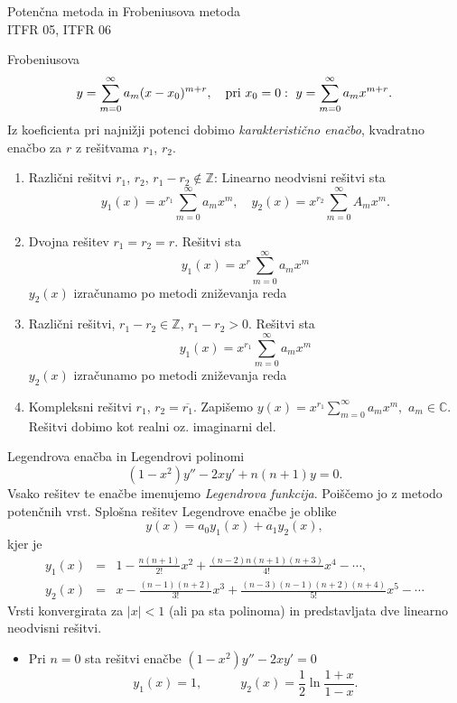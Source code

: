 \documentclass[a4paper,10pt]{article}
\begin{document}
\begin{multicols}{2}
\begin{formulaBox}{Potenčna metoda in Frobeniusova metoda}
	\\
	ITFR 05, ITFR 06

	Frobeniusova
	$$y=\sum_{m=0}^\infty a_m (x-x_0)^{m+r},\text{\quad pri }x_0=0:\  y=\sum_{m=0}^\infty a_m x^{m+r}.$$
	Iz koeficienta pri najnižji potenci  dobimo \emph{karakteristično enačbo}, kvadratno enačbo za $r$ %
	z rešitvama $r_1$, $r_2$.
	\begin{enumerate}
		\item Različni rešitvi $r_1$, $r_2$, $r_1-r_2\notin \mathbb{Z}$: Linearno neodvisni rešitvi sta 
   	$$			y_1(x)=x^{r_1}\sum_{m=0}^\infty a_m x^m,\quad
			y_2(x)=x^{r_2}\sum_{m=0}^\infty A_m x^m.$$
		
		\item Dvojna rešitev $r_1=r_2=r$.
		Rešitvi  sta
		$$y_1(x)= x^{r}\sum_{m=0}^\infty a_m x^m$$
		$y_2(x)$ izračunamo po metodi zniževanja reda
		
		\item Različni rešitvi, $r_1-r_2\in \mathbb{Z}$, $r_1-r_2> 0$. Rešitvi sta 
		$$			y_1(x)=x^{r_1} \sum_{m=0}^\infty a_m x^m$$
		$y_2(x)$ izračunamo po metodi zniževanja reda

		\item Kompleksni  rešitvi $r_1$, $r_2=\overline{r_1}$. Zapišemo 
		$y(x)=x^{r_1}\sum_{m=0}^\infty a_m x^m,$ $a_m\in \mathbb{C}$. 
		Rešitvi  dobimo kot realni oz. imaginarni del. 
	\end{enumerate} 
\end{formulaBox}

\begin{formulaBox}{Legendrova enačba in Legendrovi polinomi}
	$$(1-x^2)y''-2xy'+n(n+1)y=0.$$	
	Vsako rešitev te enačbe imenujemo \emph{Legendrova funkcija}. Poiščemo jo z metodo potenčnih vrst.
	Splošna rešitev Legendrove enačbe je oblike
	$$y(x)=a_0 y_1(x)+a_1 y_2(x),$$
	kjer je
	\begin{eqnarray*}
	y_1(x)\!\!&\!\!=\!\!&\!\! 1 -\frac{n(n+1)}{2!}x^2+ \frac{(n-2)n (n+1)(n+3)}{4!}x^4-\cdots ,\\
	y_2(x)\!\!&\!\!=\!\!&\!\!x-\frac{(n-1)(n+2)}{3!}x^3+\frac{(n-3)(n-1)(n+2)(n+4)}{5!}x^5-\cdots
	\end{eqnarray*}
	Vrsti konvergirata za $|x|<1$ (ali pa sta polinoma) in predstavljata dve linearno neodvisni rešitvi.

	\begin{itemize}
	\item  Pri 
	$n=0$ sta rešitvi enačbe  $(1-x^2)y''-2xy'=0$ 
	 $$y_1(x)=1,\quad\qquad y_2(x)=\frac{1}{2}\ln \frac{1+x}{1-x}.$$


\end{itemize}
\end{formulaBox}
\end{multicols}
\end{document}
